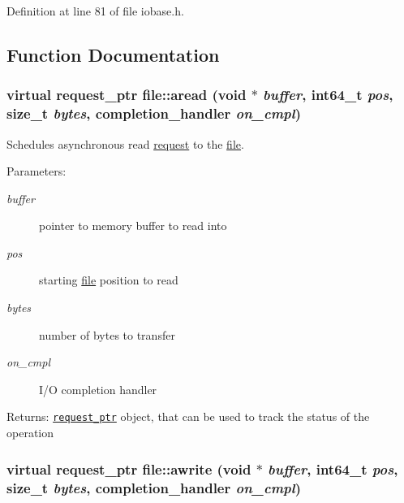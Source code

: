 Definition at line 81 of file iobase.h.

\subsection{Function Documentation}
\hypertarget{group__iolayer_gccc17bdde11461510dce18cefec5d207}{
\subsubsection[{aread}]{\setlength{\rightskip}{0pt plus 5cm}virtual {\bf request\_\-ptr} file::aread (void $\ast$ {\em buffer}, \/  int64\_\-t {\em pos}, \/  size\_\-t {\em bytes}, \/  {\bf completion\_\-handler} {\em on\_\-cmpl})}}
\label{group__iolayer_gccc17bdde11461510dce18cefec5d207}


Schedules asynchronous read \hyperlink{classrequest}{request} to the \hyperlink{classfile}{file}. 

\begin{Desc}
\item[Parameters:]
\begin{description}
\item[{\em buffer}]pointer to memory buffer to read into \item[{\em pos}]starting \hyperlink{classfile}{file} position to read \item[{\em bytes}]number of bytes to transfer \item[{\em on\_\-cmpl}]I/O completion handler \end{description}
\end{Desc}
\begin{Desc}
\item[Returns:]{\tt \hyperlink{classrequest__ptr}{request\_\-ptr}} object, that can be used to track the status of the operation \end{Desc}
\hypertarget{group__iolayer_g5c15b0b96abcfc0b06bb906afbf1dd2b}{
\subsubsection[{awrite}]{\setlength{\rightskip}{0pt plus 5cm}virtual {\bf request\_\-ptr} file::awrite (void $\ast$ {\em buffer}, \/  int64\_\-t {\em pos}, \/  size\_\-t {\em bytes}, \/  {\bf completion\_\-handler} {\em on\_\-cmpl})}}
\label{group__iolayer_g5c15b0b96abcfc0b06bb906afbf1dd2b}


